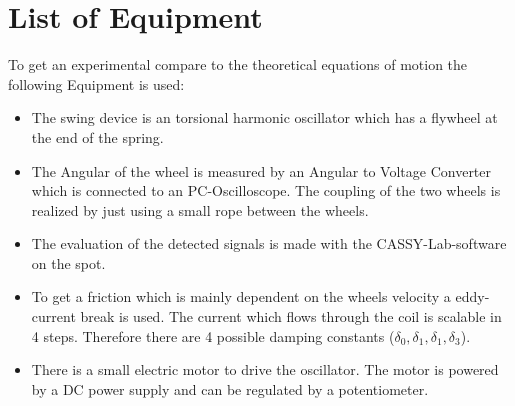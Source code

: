 \newpage
\section{List of Equipment}
To get an experimental compare to the theoretical equations of motion the following Equipment is used:
\begin{itemize}
\item The swing device is an torsional harmonic oscillator which has a flywheel at the end of the spring.
\item The Angular of the wheel is measured by an Angular to Voltage Converter which is connected to an PC-Oscilloscope. The coupling of the two wheels is realized by just using a small rope between the wheels.
\item The evaluation of the detected signals is made with the CASSY-Lab-software on the spot.
\item To get a friction which is mainly dependent on the wheels velocity a eddy-current break is used. The current which flows through the coil is  scalable in 4 steps. Therefore there are 4 possible damping constants (\(\delta_0, \delta_1, \delta_1, \delta_3 \)). 
\item There is a small electric motor to drive the oscillator. The motor is powered
by a DC power supply and can be regulated by a potentiometer.
\end{itemize}